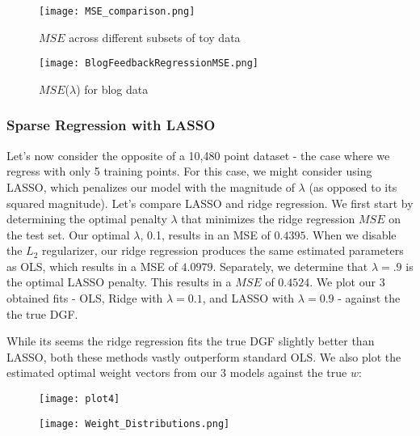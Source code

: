 \documentclass[10pt]{article}
\begin{document}
\begin{figure}[ht]
	\centering
	\begin{minipage}[b]{.48\linewidth}
                \texttt{[image: MSE\_comparison.png]}
                \caption*{$MSE$ across different subsets of toy data}                
	\end{minipage}
	\begin{minipage}[b]{.48\linewidth}
                \texttt{[image: BlogFeedbackRegressionMSE.png]}
                \caption*{$MSE$($\lambda$) for blog data}
	\end{minipage}
\end{figure}

\subsubsection*{Sparse Regression with LASSO}

Let's now consider the opposite of a 10,480 point dataset - the case where we regress with only 5  training points. For this case, we might consider using LASSO, which penalizes our model with the magnitude of $\lambda$ (as opposed to its squared magnitude). Let's compare LASSO and ridge regression. We first start by determining the optimal penalty $\lambda$ that minimizes the ridge regression $MSE$ on the test set. Our optimal $\lambda$, 0.1, results in an MSE of $0.4395$. When we disable the $L_2$ regularizer, our ridge regression produces the same estimated parameters as OLS, which results in a MSE of $4.0979$. Separately, we determine that $\lambda = .9$ is the optimal LASSO penalty. This results in a $MSE$ of $0.4524$. We plot our 3 obtained fits - OLS, Ridge with $\lambda=0.1$, and LASSO with $\lambda=0.9$ - against the the true DGF.

While its seems the ridge regression fits the true DGF slightly better than LASSO, both these methods vastly outperform standard OLS. We also plot the estimated optimal weight vectors from our 3 models against the true $w$:

\begin{figure}[ht]
	\centering
	\begin{minipage}[b]{.48\linewidth}
                \texttt{[image: plot4]}
	\end{minipage}
	\begin{minipage}[b]{.48\linewidth}
                \texttt{[image: Weight\_Distributions.png]}
	\end{minipage}
\end{figure}
\end{document}
